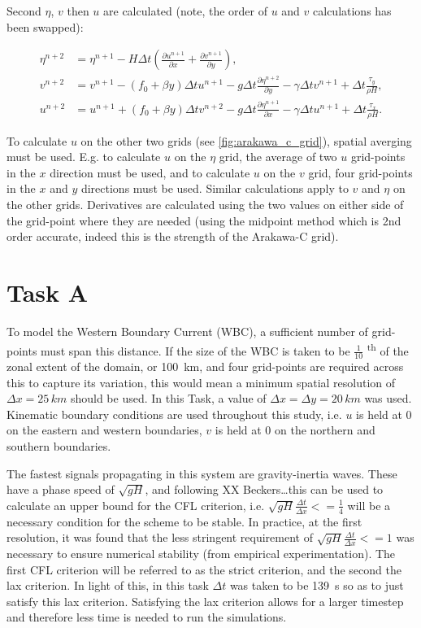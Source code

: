 \documentclass{article}
\newcommand{\ts}{\textsuperscript}
\begin{document}
Second $\eta$, $v$ then $u$ are calculated (note, the order of $u$ and $v$ calculations has been
swapped):

\begin{align}
    \label{eqn:swe_arakawa4} 
    \eta^{n+2} & =  \eta^{n+1}- H \Delta t (\frac{\partial u^{n+1}}{\partial x} + \frac{\partial
    v^{n+1}}{\partial y} ),  \\
    \label{eqn:swe_arakawa5} 
    v^{n+2} & = v^{n+1} - (f_0 + \beta y) \Delta t u^{n+1} - g \Delta t \frac{\partial \eta^{n+2}}{\partial y} -
    \gamma \Delta t v^{n+1} + \Delta t \frac{\tau_y}{\rho H}, \\
    \label{eqn:swe_arakawa6} 
    u^{n+2} & = u^{n+1} + (f_0 + \beta y) \Delta t v^{n+2} - g \Delta t \frac{\partial
	\eta^{n+1}}{\partial x} - \gamma \Delta t u^{n+1} + \Delta t \frac{\tau_x}{\rho H}.
\end{align}

To calculate $u$ on the other two grids (see \ref{fig:arakawa_c_grid}), spatial averging must
be used. E.g. to calculate $u$ on the $\eta$ grid, the average of two $u$ grid-points in the $x$
direction must be used, and to calculate $u$ on the $v$ grid, four grid-points in the $x$ and $y$
directions must be used. Similar calculations apply to $v$ and $\eta$ on the other grids.
Derivatives are calculated using the two values on either side of the grid-point where they are
needed (using the midpoint method which is 2nd order accurate, indeed this is the strength of the
Arakawa-C grid).

\section*{Task A}

To model the Western Boundary Current (WBC), a sufficient number of grid-points must span this
distance. If the size of the WBC is taken to be $\frac{1}{10}$ \ts{th} of the zonal extent of the
domain, or \SI{100}{km}, and four grid-points are required across this to capture its variation,
this would mean a minimum spatial resolution of $\Delta x = 25\, km$ should be used. In this Task, a
value of $\Delta x = \Delta y = 20\, km$ was used. Kinematic boundary conditions are used throughout
this study, i.e. $u$ is held at $0$ on the eastern and western boundaries, $v$ is held at $0$ on the
northern and southern boundaries.

The fastest signals propagating in this system are gravity-inertia waves. These have a phase speed
of $\sqrt{g H}$, and following XX Beckers\dots this can be used to calculate an upper bound for the
CFL criterion, i.e. $\sqrt{g H} \frac{\Delta t}{\Delta x} <= \frac{1}{4}$ will be a necessary
condition for the scheme to be stable. In practice, at the first resolution, it was found that the
less stringent requirement of $\sqrt{g H} \frac{\Delta t}{\Delta x} <= 1$ was necessary to ensure
numerical stability (from empirical experimentation). The first CFL criterion will be referred to as
the strict criterion, and the second the lax criterion. In light of this, in this task $\Delta t$ was
taken to be \SI{139}{s} so as to just satisfy this lax criterion. Satisfying the lax criterion
allows for a larger timestep and therefore less time is needed to run the simulations.
\end{document}
